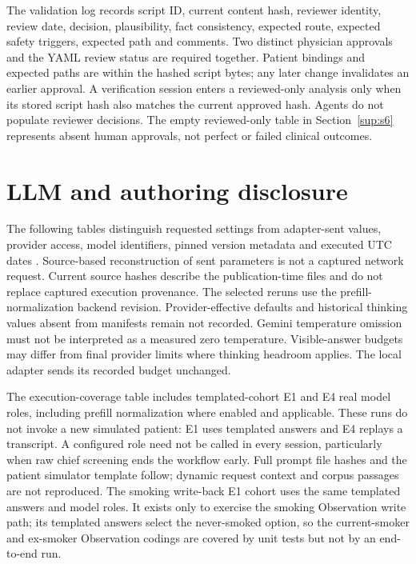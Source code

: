 The validation log records script ID, current content hash, reviewer identity,
review date, decision, plausibility, fact consistency, expected route, expected
safety triggers, expected path and comments. Two distinct physician approvals and the YAML
review status are required together. Patient bindings and expected paths are
within the hashed script bytes; any later change invalidates an earlier approval.
A verification session enters a reviewed-only analysis only when its stored
script hash also matches the current approved hash. Agents do not populate reviewer
decisions. The empty reviewed-only table in Section~\ref{sup:s6} represents absent
human approvals, not perfect or failed clinical outcomes.

\section{LLM and authoring disclosure}\label{sup:s5}
The following tables distinguish requested settings from adapter-sent values,
provider access, model identifiers, pinned version metadata and executed UTC dates
\citep{googleGeminiAPI,ollamaSoftware,gemmaThree,qwenTwoFive}. Source-based reconstruction
of sent parameters is not a captured network request. Current source hashes describe
the publication-time files and do not replace captured execution provenance.
The selected reruns use the prefill-normalization backend revision. Provider-effective defaults
and historical thinking values absent from manifests remain not recorded.
Gemini temperature omission must not be interpreted as a measured zero temperature.
Visible-answer budgets may differ from final provider limits where thinking
headroom applies. The local adapter sends its recorded budget unchanged.



The execution-coverage table includes templated-cohort E1 and E4 real
model roles, including prefill normalization where enabled and applicable. These runs do not invoke a new simulated
patient: E1 uses templated answers and E4 replays a transcript. A configured role
need not be called in every session, particularly when raw chief screening ends
the workflow early. Full prompt file hashes and the patient simulator template
follow; dynamic request context and corpus passages are not reproduced.
The smoking write-back E1 cohort uses the same templated answers and model roles.
It exists only to exercise the smoking Observation write path; its templated
answers select the never-smoked option, so the current-smoker and ex-smoker
Observation codings are covered by unit tests but not by an end-to-end run.


